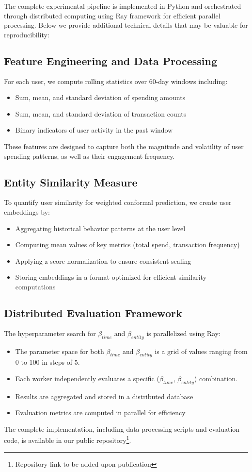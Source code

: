 The complete experimental pipeline is implemented in Python and orchestrated through distributed computing using Ray framework for efficient parallel processing. Below we provide additional technical details that may be valuable for reproducibility:
\subsection{Feature Engineering and Data Processing}
For each user, we compute rolling statistics over 60-day windows including:
\begin{itemize}
\item Sum, mean, and standard deviation of spending amounts
\item Sum, mean, and standard deviation of transaction counts
\item Binary indicators of user activity in the past window
\end{itemize}
These features are designed to capture both the magnitude and volatility of user spending patterns, as well as their engagement frequency.
\subsection{Entity Similarity Measure}
To quantify user similarity for weighted conformal prediction, we create user embeddings by:
\begin{itemize}
\item Aggregating historical behavior patterns at the user level
\item Computing mean values of key metrics (total spend, transaction frequency)
\item Applying z-score normalization to ensure consistent scaling
\item Storing embeddings in a format optimized for efficient similarity computations
\end{itemize}
\subsection{Distributed Evaluation Framework}
The hyperparameter search for $\beta_{time}$ and $\beta_{entity}$ is parallelized using Ray:
\begin{itemize}
\item The parameter space for both $\beta_{time}$ and $\beta_{entity}$ is a grid of values ranging from 0 to 100 in steps of 5.
\item Each worker independently evaluates a specific ($\beta_{time}$, $\beta_{entity}$) combination.
\item Results are aggregated and stored in a distributed database
\item Evaluation metrics are computed in parallel for efficiency
\end{itemize}
The complete implementation, including data processing scripts and evaluation code, is available in our public repository\footnote{Repository link to be added upon publication}.
